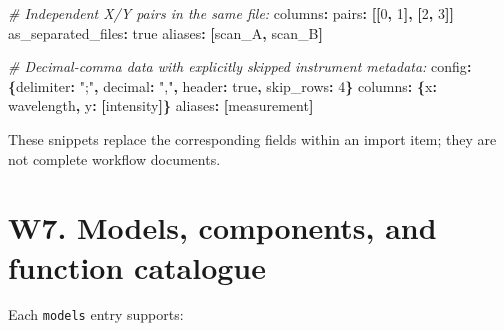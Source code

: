 \documentclass[
  10pt,
  a4paper,
  oneside]{scrreprt}
\newenvironment{Shaded}{}{}
\newcommand{\AttributeTok}[1]{\textcolor[rgb]{0.49,0.56,0.16}{#1}}
\newcommand{\CharTok}[1]{\textcolor[rgb]{0.25,0.44,0.63}{#1}}
\newcommand{\CommentTok}[1]{\textcolor[rgb]{0.38,0.63,0.69}{\textit{#1}}}
\newcommand{\DecValTok}[1]{\textcolor[rgb]{0.25,0.63,0.44}{#1}}
\newcommand{\FunctionTok}[1]{\textcolor[rgb]{0.02,0.16,0.49}{#1}}
\newcommand{\KeywordTok}[1]{\textcolor[rgb]{0.00,0.44,0.13}{\textbf{#1}}}
\newcommand{\StringTok}[1]{\textcolor[rgb]{0.25,0.44,0.63}{#1}}
\begin{document}
\begin{Shaded}
\begin{Highlighting}[]
\CommentTok{\# Independent X/Y pairs in the same file:}
\FunctionTok{columns}\KeywordTok{:}
\AttributeTok{  }\FunctionTok{pairs}\KeywordTok{:}\AttributeTok{ }\KeywordTok{[[}\DecValTok{0}\KeywordTok{,}\AttributeTok{ }\DecValTok{1}\KeywordTok{],}\AttributeTok{ }\KeywordTok{[}\DecValTok{2}\KeywordTok{,}\AttributeTok{ }\DecValTok{3}\KeywordTok{]]}
\AttributeTok{  }\FunctionTok{as\_separated\_files}\KeywordTok{:}\AttributeTok{ }\CharTok{true}
\FunctionTok{aliases}\KeywordTok{:}\AttributeTok{ }\KeywordTok{[}\AttributeTok{scan\_A}\KeywordTok{,}\AttributeTok{ scan\_B}\KeywordTok{]}
\end{Highlighting}
\end{Shaded}

\begin{Shaded}
\begin{Highlighting}[]
\CommentTok{\# Decimal{-}comma data with explicitly skipped instrument metadata:}
\FunctionTok{config}\KeywordTok{:}\AttributeTok{ }\KeywordTok{\{}\FunctionTok{delimiter}\KeywordTok{:}\AttributeTok{ }\StringTok{";"}\KeywordTok{,}\AttributeTok{ }\FunctionTok{decimal}\KeywordTok{:}\AttributeTok{ }\StringTok{","}\KeywordTok{,}\AttributeTok{ }\FunctionTok{header}\KeywordTok{:}\AttributeTok{ }\CharTok{true}\KeywordTok{,}\AttributeTok{ }\FunctionTok{skip\_rows}\KeywordTok{:}\AttributeTok{ }\DecValTok{4}\KeywordTok{\}}
\FunctionTok{columns}\KeywordTok{:}\AttributeTok{ }\KeywordTok{\{}\FunctionTok{x}\KeywordTok{:}\AttributeTok{ wavelength}\KeywordTok{,}\AttributeTok{ }\FunctionTok{y}\KeywordTok{:}\AttributeTok{ }\KeywordTok{[}\AttributeTok{intensity}\KeywordTok{]\}}
\FunctionTok{aliases}\KeywordTok{:}\AttributeTok{ }\KeywordTok{[}\AttributeTok{measurement}\KeywordTok{]}
\end{Highlighting}
\end{Shaded}

These snippets replace the corresponding fields within an import item;
they are not complete workflow documents.

\hypertarget{w7.-models-components-and-function-catalogue}{%
\section{W7. Models, components, and function
catalogue}\label{w7.-models-components-and-function-catalogue}}

Each \texttt{models} entry supports:
\end{document}
